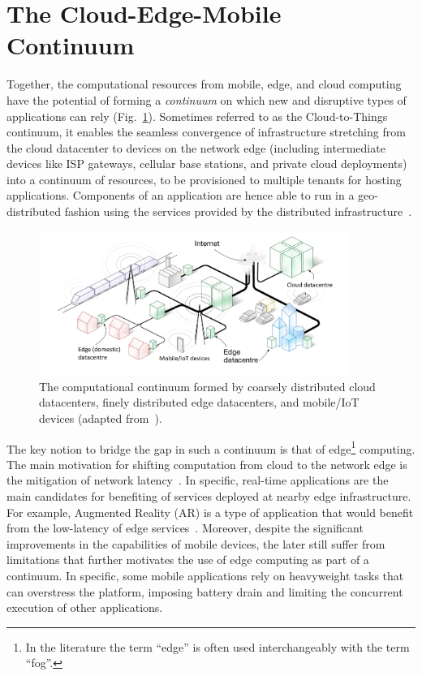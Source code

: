 \section{The Cloud-Edge-Mobile Continuum}\label{sec:continuum}

Together, the computational resources from mobile, edge, and cloud computing have the potential of forming a \textit{continuum} on which new and disruptive types of applications can rely (Fig.~\ref{fig:continuum-overral}). Sometimes referred to as the Cloud-to-Things continuum, it enables the seamless convergence of infrastructure stretching from the cloud datacenter to devices on the network edge (including intermediate devices like ISP gateways, cellular base stations, and private cloud deployments) into a continuum of resources, to be provisioned to multiple tenants for hosting applications. Components of an application are hence able to run in a geo-distributed fashion using the services provided by the distributed infrastructure~\cite{GuptaIfogSim17}. 

\begin{figure}[tbp]
	\includegraphics[width=0.9\textwidth]{figs/Continuum-overall.png}
	\caption{The computational continuum formed by coarsely distributed cloud datacenters, finely distributed edge datacenters, and mobile/IoT devices (adapted from~\cite{Tarneberg2017}).}
	\label{fig:continuum-overral}
\end{figure}

The key notion to bridge the gap in such a continuum is that of edge\footnote{In the literature the term ``edge'' is often used interchangeably with the term ``fog''.} computing. The main motivation for shifting computation from cloud to the network edge is the mitigation of network latency~\cite{Bonomi2014}. In specific, real-time applications are the main candidates for benefiting of services deployed at nearby edge infrastructure. For example, Augmented Reality (AR) is a type of application that would benefit from the low-latency of edge services~\cite{GarrigaMendonca2017}. Moreover, despite the significant improvements in the capabilities of mobile devices, the later still suffer from limitations that further motivates the use of edge computing as part of a continuum. In specific, some mobile applications rely on heavyweight tasks that can overstress the platform, imposing battery drain and limiting the concurrent execution of other applications. 


